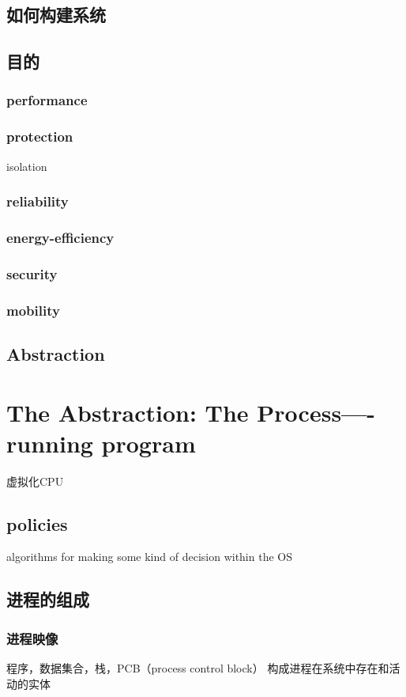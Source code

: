 \documentclass{ctexart}
\begin{document}
\subsection{如何构建系统}
\subsection{目的}
\subsubsection{performance}
\subsubsection{protection}
isolation
\subsubsection{reliability}
\subsubsection{energy-efficiency}
\subsubsection{security}
\subsubsection{mobility}
\subsection{Abstraction}



\section{The Abstraction: The Process----running program}
\label{sec:second}
虚拟化CPU
\subsection{policies}
algorithms for making some kind of decision within the OS

\subsection{进程的组成}
\subsubsection{进程映像}
程序，数据集合，栈，PCB（process control block）
构成进程在系统中存在和活动的实体
\end{document}
